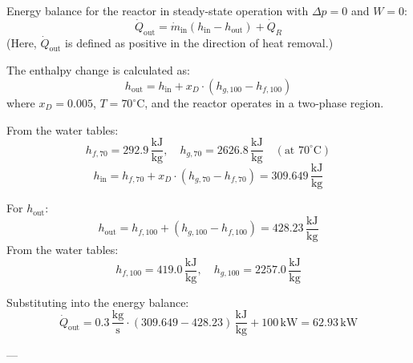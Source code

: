 Energy balance for the reactor in steady-state operation with \( \Delta p = 0 \) and \( W = 0 \):  
\[
\dot{Q}_{\text{out}} = \dot{m}_{\text{in}} \left( h_{\text{in}} - h_{\text{out}} \right) + \dot{Q}_R
\]  
(Here, \( \dot{Q}_{\text{out}} \) is defined as positive in the direction of heat removal.)  

The enthalpy change is calculated as:  
\[
h_{\text{out}} = h_{\text{in}} + x_D \cdot \left( h_{g,100} - h_{f,100} \right)
\]  
where \( x_D = 0.005 \), \( T = 70^\circ\text{C} \), and the reactor operates in a two-phase region.  

From the water tables:  
\[
h_{f,70} = 292.9 \, \frac{\text{kJ}}{\text{kg}}, \quad h_{g,70} = 2626.8 \, \frac{\text{kJ}}{\text{kg}} \quad (\text{at } 70^\circ\text{C})
\]  
\[
h_{\text{in}} = h_{f,70} + x_D \cdot \left( h_{g,70} - h_{f,70} \right) = 309.649 \, \frac{\text{kJ}}{\text{kg}}
\]  

For \( h_{\text{out}} \):  
\[
h_{\text{out}} = h_{f,100} + \left( h_{g,100} - h_{f,100} \right) = 428.23 \, \frac{\text{kJ}}{\text{kg}}
\]  
From the water tables:  
\[
h_{f,100} = 419.0 \, \frac{\text{kJ}}{\text{kg}}, \quad h_{g,100} = 2257.0 \, \frac{\text{kJ}}{\text{kg}}
\]  

Substituting into the energy balance:  
\[
\dot{Q}_{\text{out}} = 0.3 \, \frac{\text{kg}}{\text{s}} \cdot \left( 309.649 - 428.23 \right) \, \frac{\text{kJ}}{\text{kg}} + 100 \, \text{kW} = 62.93 \, \text{kW}
\]  

---